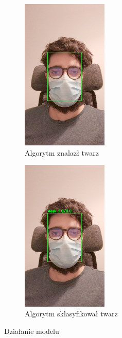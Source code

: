 \documentclass[12pt]{article}
\begin{document}
		\begin{figure}[h]
			\centering
			\begin{subfigure}[b]{0.49\textwidth}
				\centering
				\includegraphics[width=0.45\textwidth]{twarz.jpeg}
				\caption{Algorytm znalazł twarz}
				\label{fig:twarz}
			\end{subfigure}
			\hfil
			\begin{subfigure}[b]{0.49\textwidth}
				\centering
				\includegraphics[width=0.45\textwidth]{maska.jpeg}
				\caption{Algorytm sklasyfikował twarz}
				\label{fig:maska}
			\end{subfigure}
			\caption{Działanie modelu}
		\end{figure}
\end{document}
